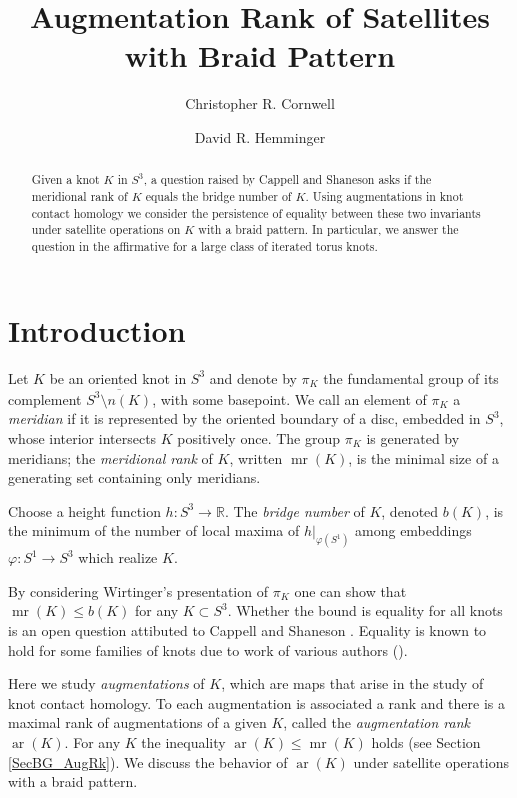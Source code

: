 \documentclass[11pt]{amsart}
\def\R{{\mathbb R}}
\def\ar{\operatorname{ar}}
\def\mr{\operatorname{mr}}
\theoremstyle{definition}
\begin{document}
\title{Augmentation Rank of Satellites with Braid Pattern}

\author{Christopher R. Cornwell}
\author{David R. Hemminger}

\begin{abstract}
Given a knot $K$ in $S^3$, a question raised by Cappell and Shaneson asks if the meridional rank of $K$ equals the bridge number of $K$. Using augmentations in knot contact homology we consider the persistence of equality between these two invariants under satellite operations on $K$ with a braid pattern. In particular, we answer the question in the affirmative for a large class of iterated torus knots.
\end{abstract}

\maketitle


\section{Introduction}
Let $K$ be an oriented knot in $S^3$ and denote by $\pi_K$ the fundamental group of its complement $\overline{S^3\setminus n(K)}$, with some basepoint. We call an element of $\pi_K$ a \emph{meridian} if it is represented by the oriented boundary of a disc, embedded in $S^3$, whose interior intersects $K$ positively once. The group $\pi_K$ is generated by meridians; the \emph{meridional rank} of $K$, written $\mr(K)$, is the minimal size of a generating set containing only meridians. 

Choose a height function $h:S^3\to\R$. The \emph{bridge number} of $K$, denoted $b(K)$, is the minimum of the number of local maxima of $h|_{\varphi(S^1)}$ among embeddings $\varphi:S^1\to S^3$ which realize $K$.

By considering Wirtinger's presentation of $\pi_K$ one can show that $\mr(K)\le b(K)$ for any $K\subset S^3$. Whether the bound is equality for all knots is an open question attibuted to Cappell and Shaneson \cite[Prob. 1.11]{Kir95}. Equality is known to hold for some families of knots due to work of various authors (\cite{BZ,Cor13b,RZ}).

Here we study \emph{augmentations} of $K$, which are maps that arise in the study of knot contact homology. To each augmentation is associated a rank and there is a maximal rank of augmentations of a given $K$, called the \emph{augmentation rank} $\ar(K)$. For any $K$ the inequality $\ar(K)\le \mr(K)$ holds (see Section \ref{SecBG_AugRk}). We discuss the behavior of $\ar(K)$ under satellite operations with a braid pattern. 
\end{document}
